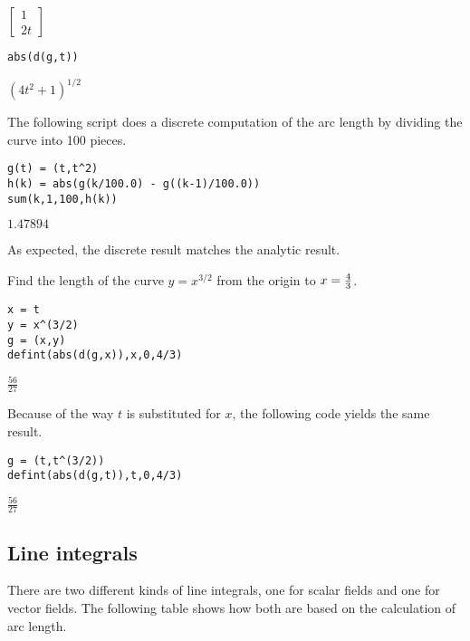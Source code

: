 \noindent
$\displaystyle \begin{bmatrix}1\\ 2t\end{bmatrix}$

\begin{Verbatim}[formatcom=\color{blue},samepage=true]
abs(d(g,t))
\end{Verbatim}

\noindent
$\displaystyle (4t^2+1)^{1/2}$

\bigskip
\noindent
The following script does a discrete computation of the arc length
by dividing the curve into 100 pieces.

\begin{Verbatim}[formatcom=\color{blue},samepage=true]
g(t) = (t,t^2)
h(k) = abs(g(k/100.0) - g((k-1)/100.0))
sum(k,1,100,h(k))
\end{Verbatim}

\noindent
$\displaystyle 1.47894$

\bigskip
\noindent
As expected, the discrete result matches the analytic result.

\bigskip
\noindent
Find the length of the curve $y=x^{3/2}$ from the origin to
$x={4\over3}$.

\begin{Verbatim}[formatcom=\color{blue},samepage=true]
x = t
y = x^(3/2)
g = (x,y)
defint(abs(d(g,x)),x,0,4/3)
\end{Verbatim}

\noindent
$\displaystyle \tfrac{56}{27}$

\bigskip
\noindent
Because of the way $t$ is substituted for $x$,
the following code yields the same result.

\begin{Verbatim}[formatcom=\color{blue},samepage=true]
g = (t,t^(3/2))
defint(abs(d(g,t)),t,0,4/3)
\end{Verbatim}

\noindent
$\displaystyle \tfrac{56}{27}$

\subsection{Line integrals}
There are two different kinds of line integrals,
one for scalar fields and one
for vector fields.
The following table shows how both are based on the calculation of
arc length.

